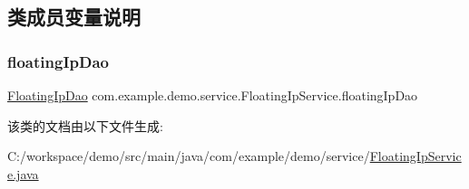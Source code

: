\subsection{类成员变量说明}
\mbox{\label{classcom_1_1example_1_1demo_1_1service_1_1_floating_ip_service_ab5766aa725bf523052cf14dcfb4f3e70}} 
\subsubsection{\texorpdfstring{floating\+Ip\+Dao}{floatingIpDao}}
{\footnotesize\ttfamily \mbox{\hyperlink{interfacecom_1_1example_1_1demo_1_1dao_1_1_floating_ip_dao}{Floating\+Ip\+Dao}} com.\+example.\+demo.\+service.\+Floating\+Ip\+Service.\+floating\+Ip\+Dao\hspace{0.3cm}{\ttfamily [package]}}



该类的文档由以下文件生成\+:\begin{DoxyCompactItemize}
\item 
C\+:/workspace/demo/src/main/java/com/example/demo/service/\mbox{\hyperlink{_floating_ip_service_8java}{Floating\+Ip\+Service.\+java}}\end{DoxyCompactItemize}
